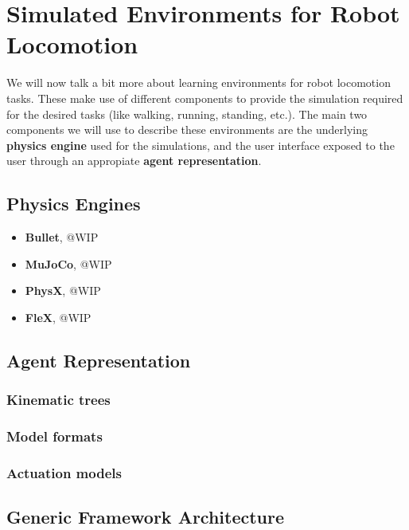 \section{Simulated Environments for Robot Locomotion}

We will now talk a bit more about learning environments for robot locomotion tasks.
These make use of different components to provide the simulation required for the desired
tasks (like walking, running, standing, etc.). The main two components we will use
to describe these environments are the underlying \textbf{physics engine} used for the simulations, 
and the user interface exposed to the user through an appropiate \textbf{agent representation}.

\subsection{Physics Engines}


\begin{itemize}
    \item \textbf{Bullet}, @WIP
    \item \textbf{MuJoCo}, @WIP
    \item \textbf{PhysX}, @WIP
    \item \textbf{FleX}, @WIP
\end{itemize}

\subsection{Agent Representation}


\subsubsection{Kinematic trees}


\subsubsection{Model formats}


\subsubsection{Actuation models}


\subsection{Generic Framework Architecture}

